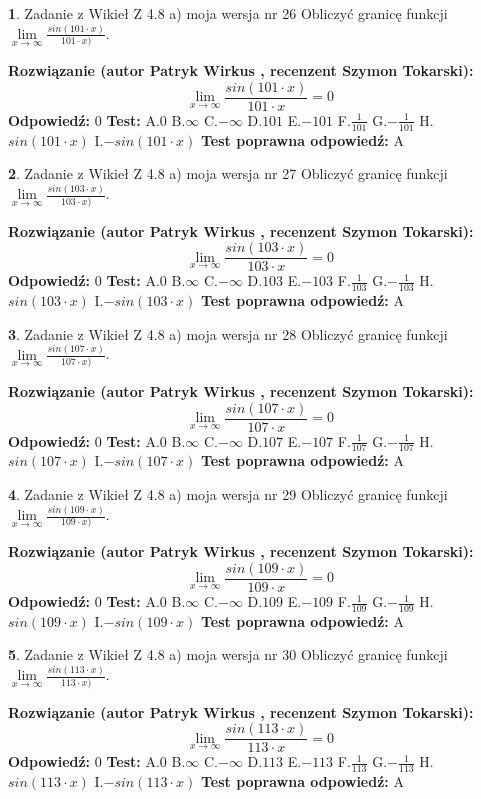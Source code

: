 \documentclass[12pt, a4paper]{article}
\theoremstyle{definition} %
\newtheorem{zad}{}
\newcommand{\zadStart}[1]{\begin{zad}#1\newline}
\newcommand{\zadStop}{\end{zad}}
\newcommand{\rozwStart}[2]{\noindent \textbf{Rozwiązanie (autor #1 , recenzent #2): }\newline}
\newcommand{\rozwStop}{\newline}
\newcommand{\odpStart}{\noindent \textbf{Odpowiedź:}\newline}
\newcommand{\odpStop}{\newline}
\newcommand{\testStart}{\noindent \textbf{Test:}\newline}
\newcommand{\testStop}{\newline}
\newcommand{\kluczStart}{\noindent \textbf{Test poprawna odpowiedź:}\newline}
\newcommand{\kluczStop}{\newline}
\begin{document}
\zadStart{Zadanie z Wikieł Z 4.8 a) moja wersja nr 26}
Obliczyć granicę funkcji $\lim\limits_{x\to \infty}\frac{sin(101\cdot x)}{101\cdot x)}$.
\zadStop
\rozwStart{Patryk Wirkus}{Szymon Tokarski}
$$\lim\limits_{x\to \infty}\frac{sin(101\cdot x)}{101\cdot x}=
0$$
\rozwStop
\odpStart
$0$
\odpStop
\testStart
A.$0$ B.$\infty$ C.$-\infty$ D.$101$ E.$-101$
F.$\frac{1}{101}$ G.$-\frac{1}{101}$
H.$sin(101\cdot x)$
I.$-sin(101\cdot x)$
\testStop
\kluczStart
A
\kluczStop



\zadStart{Zadanie z Wikieł Z 4.8 a) moja wersja nr 27}
Obliczyć granicę funkcji $\lim\limits_{x\to \infty}\frac{sin(103\cdot x)}{103\cdot x)}$.
\zadStop
\rozwStart{Patryk Wirkus}{Szymon Tokarski}
$$\lim\limits_{x\to \infty}\frac{sin(103\cdot x)}{103\cdot x}=
0$$
\rozwStop
\odpStart
$0$
\odpStop
\testStart
A.$0$ B.$\infty$ C.$-\infty$ D.$103$ E.$-103$
F.$\frac{1}{103}$ G.$-\frac{1}{103}$
H.$sin(103\cdot x)$
I.$-sin(103\cdot x)$
\testStop
\kluczStart
A
\kluczStop



\zadStart{Zadanie z Wikieł Z 4.8 a) moja wersja nr 28}
Obliczyć granicę funkcji $\lim\limits_{x\to \infty}\frac{sin(107\cdot x)}{107\cdot x)}$.
\zadStop
\rozwStart{Patryk Wirkus}{Szymon Tokarski}
$$\lim\limits_{x\to \infty}\frac{sin(107\cdot x)}{107\cdot x}=
0$$
\rozwStop
\odpStart
$0$
\odpStop
\testStart
A.$0$ B.$\infty$ C.$-\infty$ D.$107$ E.$-107$
F.$\frac{1}{107}$ G.$-\frac{1}{107}$
H.$sin(107\cdot x)$
I.$-sin(107\cdot x)$
\testStop
\kluczStart
A
\kluczStop



\zadStart{Zadanie z Wikieł Z 4.8 a) moja wersja nr 29}
Obliczyć granicę funkcji $\lim\limits_{x\to \infty}\frac{sin(109\cdot x)}{109\cdot x)}$.
\zadStop
\rozwStart{Patryk Wirkus}{Szymon Tokarski}
$$\lim\limits_{x\to \infty}\frac{sin(109\cdot x)}{109\cdot x}=
0$$
\rozwStop
\odpStart
$0$
\odpStop
\testStart
A.$0$ B.$\infty$ C.$-\infty$ D.$109$ E.$-109$
F.$\frac{1}{109}$ G.$-\frac{1}{109}$
H.$sin(109\cdot x)$
I.$-sin(109\cdot x)$
\testStop
\kluczStart
A
\kluczStop



\zadStart{Zadanie z Wikieł Z 4.8 a) moja wersja nr 30}
Obliczyć granicę funkcji $\lim\limits_{x\to \infty}\frac{sin(113\cdot x)}{113\cdot x)}$.
\zadStop
\rozwStart{Patryk Wirkus}{Szymon Tokarski}
$$\lim\limits_{x\to \infty}\frac{sin(113\cdot x)}{113\cdot x}=
0$$
\rozwStop
\odpStart
$0$
\odpStop
\testStart
A.$0$ B.$\infty$ C.$-\infty$ D.$113$ E.$-113$
F.$\frac{1}{113}$ G.$-\frac{1}{113}$
H.$sin(113\cdot x)$
I.$-sin(113\cdot x)$
\testStop
\kluczStart
A
\kluczStop
\end{document}
